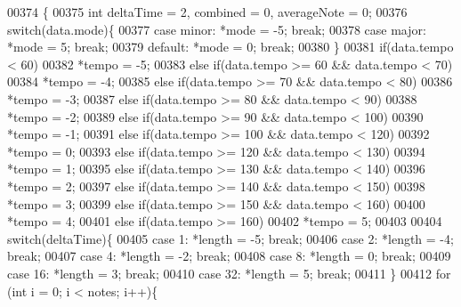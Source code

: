 \begin{DoxyCode}
00374                                                                                                            
              \{
00375   \textcolor{keywordtype}{int} deltaTime = 2, combined = 0, averageNote = 0;
00376   \textcolor{keywordflow}{switch}(data.mode)\{
00377     \textcolor{keywordflow}{case} minor: *mode = -5; \textcolor{keywordflow}{break};
00378     \textcolor{keywordflow}{case} major: *mode = 5; \textcolor{keywordflow}{break};
00379     \textcolor{keywordflow}{default}: *mode = 0; \textcolor{keywordflow}{break};
00380   \}
00381   \textcolor{keywordflow}{if}(data.tempo < 60)
00382     *tempo = -5;
00383   \textcolor{keywordflow}{else} \textcolor{keywordflow}{if}(data.tempo >= 60 && data.tempo < 70)
00384     *tempo = -4;
00385   \textcolor{keywordflow}{else} \textcolor{keywordflow}{if}(data.tempo >= 70 && data.tempo < 80)
00386     *tempo = -3;  
00387   \textcolor{keywordflow}{else} \textcolor{keywordflow}{if}(data.tempo >= 80 && data.tempo < 90)
00388     *tempo = -2;
00389   \textcolor{keywordflow}{else} \textcolor{keywordflow}{if}(data.tempo >= 90 && data.tempo < 100)
00390     *tempo = -1;
00391   \textcolor{keywordflow}{else} \textcolor{keywordflow}{if}(data.tempo >= 100 && data.tempo < 120)
00392     *tempo =  0;  
00393   \textcolor{keywordflow}{else} \textcolor{keywordflow}{if}(data.tempo >= 120 && data.tempo < 130)
00394     *tempo =  1;
00395   \textcolor{keywordflow}{else} \textcolor{keywordflow}{if}(data.tempo >= 130 && data.tempo < 140)
00396     *tempo =  2;
00397   \textcolor{keywordflow}{else} \textcolor{keywordflow}{if}(data.tempo >= 140 && data.tempo < 150)
00398     *tempo =  3;
00399   \textcolor{keywordflow}{else} \textcolor{keywordflow}{if}(data.tempo >= 150 && data.tempo < 160)
00400     *tempo =  4;
00401   \textcolor{keywordflow}{else} \textcolor{keywordflow}{if}(data.tempo >=  160)
00402     *tempo =  5;
00403 
00404   \textcolor{keywordflow}{switch}(deltaTime)\{
00405     \textcolor{keywordflow}{case} 1: *length = -5; \textcolor{keywordflow}{break};
00406     \textcolor{keywordflow}{case} 2: *length = -4; \textcolor{keywordflow}{break};
00407     \textcolor{keywordflow}{case} 4: *length = -2; \textcolor{keywordflow}{break};
00408     \textcolor{keywordflow}{case} 8: *length =  0; \textcolor{keywordflow}{break};
00409     \textcolor{keywordflow}{case} 16: *length = 3; \textcolor{keywordflow}{break};
00410     \textcolor{keywordflow}{case} 32: *length = 5; \textcolor{keywordflow}{break};
00411   \}
00412   \textcolor{keywordflow}{for} (\textcolor{keywordtype}{int} i = 0; i < notes; i++)\{

\end{DoxyCode}
